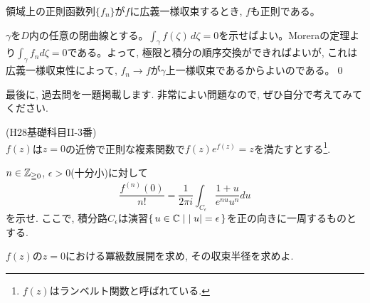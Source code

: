 \begin{theo}
領域上の正則函数列$\{ f_n \}$が$f$に広義一様収束するとき, $f$も正則である。
\end{theo}
\prf
$\gamma$を$D$内の任意の閉曲線とする。$\int_{\gamma} f(\zeta) \, d\zeta = 0$を示せばよい。Moreraの定理より$\int_{\gamma} f_n d\zeta = 0$である。よって, 極限と積分の順序交換ができればよいが, これは広義一様収束性によって, $f_n\to f$が$\gamma$上一様収束であるからよいのである。\qed


最後に, 過去問を一題掲載します. 非常によい問題なので, ぜひ自分で考えてみてください.
\begin{prob} (H28基礎科目II-3番)\\
$f(z)$は$z=0$の近傍で正則な複素関数で$f(z)e^{f(z)} = z$を満たすとする\footnote{$f(z)$はランベルト関数と呼ばれている.}.
\ben
\item $n\in \mathbb{Z}_{\geqq 0}$, $\epsilon>0$(十分小)に対して
\[\dfrac{f^{(n)}(0)}{n!} = \dfrac{1}{2\pi i}\int_{C_{\epsilon}} \dfrac{1+u}{e^{nu}u^n} du\]
を示せ. ここで, 積分路$C_{\epsilon}$は演習$\set{u\in\mathbb{C}\mid |u|=\epsilon}$を正の向きに一周するものとする.
\item $f(z)$の$z=0$における冪級数展開を求め, その収束半径を求めよ.
\item
\een
\end{prob}




\newpage
